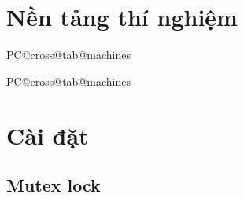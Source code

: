 \documentclass[a4paper]{article}
\makeatletter
\newif\ifshowtodo
\newcommand{\PCmissing}[1]{\ifshowtodo\par\medskip\noindent\fcolorbox{black!35}{black!4}{%
  \parbox{\dimexpr\linewidth-2\fboxsep-2\fboxrule}{\small\itshape\color{black!65}#1}}\par\medskip\fi}
\newcommand{\PCname}[1]{\texttt{\detokenize{#1}}}
\newcommand{\PCtable}[2]{%
  \ifcsname PC@#1@tab@#2\endcsname
    \begin{table}[H]\centering
      \caption{\csname PC@#1@tabcap@#2\endcsname}\label{tab:#1:#2}
      \csname PC@#1@tab@#2\endcsname
    \end{table}
  \else
    \PCmissing{Bảng \PCname{#2} của \PCname{#1} chưa có. Chạy \texttt{make bench} trên máy đó,
      chép \texttt{results/\detokenize{#1}/} về, rồi chạy \texttt{make figures}.}%
  \fi}
\makeatother
\begin{document}
\section{Nền tảng thí nghiệm}

\PCtable{cross}{machines}

\section{Cài đặt}\label{sec:impl}

\subsection{Mutex lock}

\end{document}

